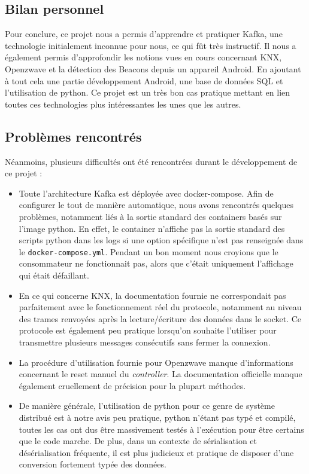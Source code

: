 \subsection{Bilan personnel}
Pour conclure, ce projet nous a permis d'apprendre et pratiquer Kafka, une technologie initialement inconnue pour nous, ce qui fût très instructif. Il nous a également permis d'approfondir les notions vues en cours concernant KNX, Openzwave et la détection des Beacons depuis un appareil Android. En ajoutant à tout cela une partie développement Android, une base de données SQL et l'utilisation de python. Ce projet est un très bon cas pratique mettant en lien toutes ces technologies plus intéressantes les unes que les autres.

\subsection{Problèmes rencontrés}
Néanmoins, plusieurs difficultés ont été rencontrées durant le développement de ce projet :
\begin{itemize}
    \item Toute l'architecture Kafka est déployée avec docker-compose. Afin de configurer le tout de manière automatique, nous avons rencontrés quelques problèmes, notamment liés à la sortie standard des containers basés sur l'image python. En effet, le container n'affiche pas la sortie standard des scripts python dans les logs si une option spécifique n'est pas renseignée dans le \texttt{docker-compose.yml}. Pendant un bon moment nous croyions que le consommateur ne fonctionnait pas, alors que c'était uniquement l'affichage qui était défaillant.
    \item En ce qui concerne KNX, la documentation fournie ne correspondait pas parfaitement avec le fonctionnement réel du protocole, notamment au niveau des trames renvoyées après la lecture/écriture des données dans le socket. Ce protocole est également peu pratique lorsqu'on souhaite l'utiliser pour transmettre plusieurs messages consécutifs sans fermer la connexion.
    \item La procédure d'utilisation fournie pour Openzwave manque d'informations concernant le reset manuel du \textit{controller}. La documentation officielle manque également cruellement de précision pour la plupart méthodes.
    \item De manière générale, l'utilisation de python pour ce genre de système distribué est à notre avis peu pratique, python n'étant pas typé et compilé, toutes les cas ont dus être massivement testés à l'exécution pour être certains que le code marche. De plus, dans un contexte de sérialisation et désérialisation fréquente, il est plus judicieux et pratique de disposer d'une conversion fortement typée des données.
\end{itemize}

